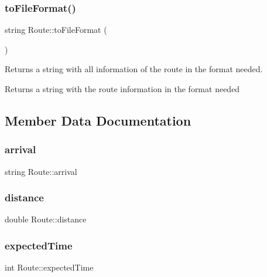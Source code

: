 \subsubsection{\texorpdfstring{to\+File\+Format()}{toFileFormat()}}
{\footnotesize\ttfamily string Route\+::to\+File\+Format (\begin{DoxyParamCaption}{ }\end{DoxyParamCaption})}

Returns a string with all information of the route in the format needed. \begin{DoxyReturn}{Returns}
a string with the route information in the format needed 
\end{DoxyReturn}


\subsection{Member Data Documentation}
\hypertarget{classRoute_adc36330c18132468643c316cdcde3c86}{}\label{classRoute_adc36330c18132468643c316cdcde3c86} 
\subsubsection{\texorpdfstring{arrival}{arrival}}
{\footnotesize\ttfamily string Route\+::arrival\hspace{0.3cm}{\ttfamily [private]}}

\hypertarget{classRoute_a8f6f506a1c61c2e27ba69e5eff5805a1}{}\label{classRoute_a8f6f506a1c61c2e27ba69e5eff5805a1} 
\subsubsection{\texorpdfstring{distance}{distance}}
{\footnotesize\ttfamily double Route\+::distance\hspace{0.3cm}{\ttfamily [private]}}

\hypertarget{classRoute_a1f2959ab7a51bd76846d649a7d93bdbe}{}\label{classRoute_a1f2959ab7a51bd76846d649a7d93bdbe} 
\subsubsection{\texorpdfstring{expected\+Time}{expectedTime}}
{\footnotesize\ttfamily int Route\+::expected\+Time\hspace{0.3cm}{\ttfamily [private]}}

